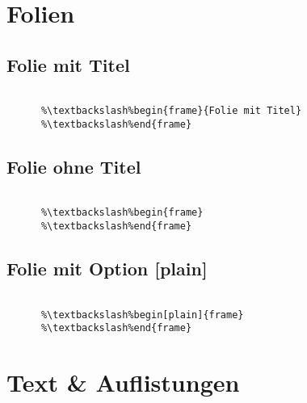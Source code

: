 \section{Folien}

  \subsection{Folie mit Titel}
  \begin{frame}[fragile]{\subsecname}

    \begin{lstlisting}[gobble=6,escapechar=\%]
      %\%% Folie mit Titel

      %\textbackslash%begin{frame}{Folie mit Titel}
      %\textbackslash%end{frame}
    \end{lstlisting}

  \end{frame}

  \subsection{Folie ohne Titel}
  \begin{frame}[fragile]

    \begin{lstlisting}[gobble=6,escapechar=\%]
      %\%% Folie ohne Titel
      
      %\textbackslash%begin{frame}
      %\textbackslash%end{frame}
    \end{lstlisting}
    
  \end{frame}

  \subsection{Folie mit Option [plain]}
  \begin{frame}

    \begin{lstlisting}[gobble=6,escapechar=\%]
      %\%% Folie mit Option [plain]

      %\textbackslash%begin[plain]{frame}
      %\textbackslash%end{frame}
    \end{lstlisting}

  \end{frame}

\section{Text \& Auflistungen}

